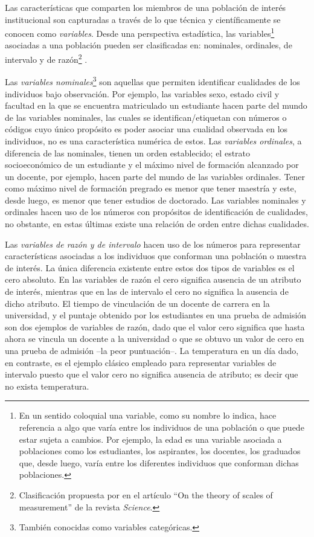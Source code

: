 \documentclass[
]{book}
\begin{document}
Las características que comparten los miembros de una población de interés institucional son capturadas a través de lo que técnica y científicamente se conocen como \emph{variables}. Desde una perspectiva estadística, las variables\footnote{En un sentido coloquial una variable, como su nombre lo indica, hace referencia a algo que varía entre los individuos de una población o que puede estar sujeta a cambios. Por ejemplo, la edad es una variable asociada a poblaciones como los estudiantes, los aspirantes, los docentes, los graduados que, desde luego, varía entre los diferentes individuos que conforman dichas poblaciones.} asociadas a una población pueden ser clasificadas en: nominales, ordinales, de intervalo y de razón\footnote{Clasificación propuesta por \citet{stevens1946theory} en el artículo ``On the theory of scales of measurement'' de la revista \emph{Science}.} .

Las \emph{variables nominales}\footnote{También conocidas como variables categóricas.} son aquellas que permiten identificar cualidades de los individuos bajo observación. Por ejemplo, las variables sexo, estado civil y facultad en la que se encuentra matriculado un estudiante hacen parte del mundo de las variables nominales, las cuales se identifican/etiquetan con números o códigos cuyo único propósito es poder asociar una cualidad observada en los individuos, no es una característica numérica de estos. Las \emph{variables ordinales}, a diferencia de las nominales, tienen un orden establecido; el estrato socioeconómico de un estudiante y el máximo nivel de formación alcanzado por un docente, por ejemplo, hacen parte del mundo de las variables ordinales. Tener como máximo nivel de formación pregrado es menor que tener maestría y este, desde luego, es menor que tener estudios de doctorado. Las variables nominales y ordinales hacen uso de los números con propósitos de identificación de cualidades, no obstante, en estas últimas existe una relación de orden entre dichas cualidades.

Las \emph{variables de razón y de intervalo} hacen uso de los números para representar características asociadas a los individuos que conforman una población o muestra de interés. La única diferencia existente entre estos dos tipos de variables es el cero absoluto. En las variables de razón el cero significa ausencia de un atributo de interés, mientras que en las de intervalo el cero no significa la ausencia de dicho atributo. El tiempo de vinculación de un docente de carrera en la universidad, y el puntaje obtenido por los estudiantes en una prueba de admisión son dos ejemplos de variables de razón, dado que el valor cero significa que hasta ahora se vincula un docente a la universidad o que se obtuvo un valor de cero en una prueba de admisión --la peor puntuación--. La temperatura en un día dado, en contraste, es el ejemplo clásico empleado para representar variables de intervalo puesto que el valor cero no significa ausencia de atributo; es decir que no exista temperatura.
\end{document}
